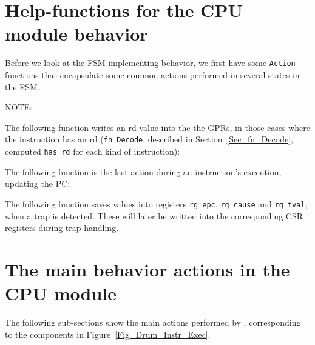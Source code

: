 \section{Help-functions for the {\DRUM} CPU module behavior}

\label{Sec_Drum_FSM_help_fns}

Before we look at the FSM implementing {\DRUM} behavior, we first have
some \verb|Action| functions that encapsulate some common actions
performed in several states in the FSM.

\vspace{2ex}

NOTE: 

The following function writes an rd-value into the the GPRs, in those
cases where the instruction has an rd (\verb|fn_Decode|, described in
Section~\ref{Sec_fn_Decode}, computed \verb|has_rd| for each kind of
instruction):


The following function is the last action during an instruction's
execution, updating the PC:


The following function saves values into registers \verb|rg_epc|,
\verb|rg_cause| and \verb|rg_tval|, when a trap is detected.  These
will later be written into the corresponding CSR registers during
trap-handling.



\section{The main behavior actions in the {\DRUM} CPU module}

\label{Sec_Drum_actions}


The following sub-sections show the main actions performed by {\DRUM},
corresponding to the components in Figure~\ref{Fig_Drum_Instr_Exec}.

